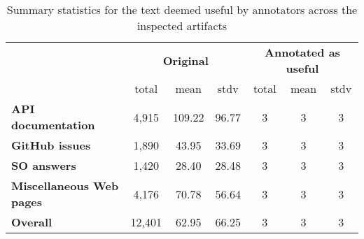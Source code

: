 \begin{table} %
\centering    
\begin{scriptsize}
\begin{threeparttable}
\begin{tabular}{lcccccc}


& \multicolumn{3}{c}{\textbf{Original}}
& \multicolumn{3}{c}{\textbf{Annotated as useful}}
\\ \cmidrule(l){2-4} \cmidrule(l){5-7}

& total & mean & stdv &  total & mean & stdv \\

\hline
\hline

\textbf{API documentation} 
& 4,915 & 109.22 & 96.77 & 3 & 3 & 3
\\
\textbf{GitHub issues} 
& 1,890 &  43.95 & 33.69 &  3 & 3 & 3
\\
\textbf{SO answers} 
& 1,420 & 28.40 & 28.48 & 3 &  3 & 3
\\
\textbf{Miscellaneous Web pages} 
& 4,176 & 70.78 & 56.64 
& 3 & 3 & 3
\\

\hline
\hline
\textbf{Overall} 
& 12,401 & 62.95 & 66.25 
& 3 & 3 & 3
\\
\hline

\end{tabular}
\end{threeparttable}
\end{scriptsize}
\caption{Summary statistics for the text deemed useful by annotators across the inspected artifacts}
\label{tbl:corpus-annotation-summary}
\end{table}

